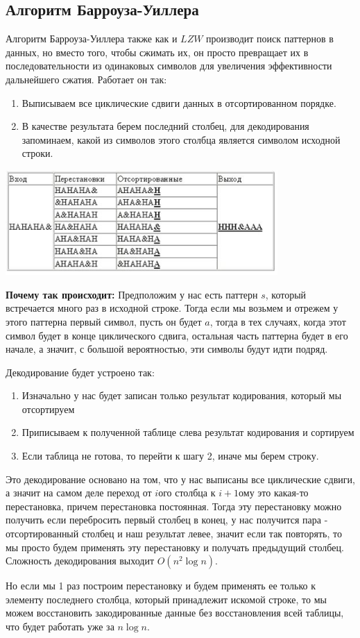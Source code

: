 \subsection{Алгоритм Барроуза-Уиллера}
Алгоритм Барроуза-Уиллера также как и $LZW$ производит поиск паттернов в данных, но вместо того, чтобы сжимать их, он просто превращает их в последовательности из одинаковых символов для увеличения эффективности дальнейшего сжатия. Работает он так:
\begin{enumerate}
    \item Выписываем все циклические сдвиги данных в отсортированном порядке.
    \item В качестве результата берем последний столбец, для декодирования запоминаем, какой из символов этого столбца является символом исходной строки.
\end{enumerate} 
\begin{center}
  \includegraphics[height=4cm]{assets/barr.jpg}
\end{center}
\textbf{Почему так происходит:} Предположим у нас есть паттерн $s$, который встречается много раз в исходной строке. Тогда если мы возьмем и отрежем у этого паттерна первый символ, пусть он будет $a$, тогда в тех случаях, когда этот символ будет в конце циклического сдвига, остальная часть паттерна будет в его начале, а значит, с большой вероятностью, эти символы будут идти подряд.

Декодирование будет устроено так:
\begin{enumerate}
    \item Изначально у нас будет записан только результат кодирования, который мы отсортируем
    \item Приписываем к полученной таблице слева результат кодирования и сортируем
    \item Если таблица не готова, то перейти к шагу 2, иначе мы берем строку.
\end{enumerate}
Это декодирование основано на том, что у нас выписаны все циклические сдвиги, а значит на самом деле переход от $i$ого столбца к $i+1$ому это какая-то перестановка, причем перестановка постоянная. Тогда эту перестановку можно получить если перебросить первый столбец в конец, у нас получится пара - отсортированный столбец и наш результат левее, значит если так повторять, то мы просто будем применять эту перестановку и получать предыдущий столбец. Сложность декодирования выходит $O(n^2\log n)$.

Но если мы 1 раз построим перестановку и будем применять ее только к элементу последнего столбца, который принадлежит искомой строке, то мы можем восстановить закодированные данные без восстановления всей таблицы, что будет работать уже за $n\log n$.
